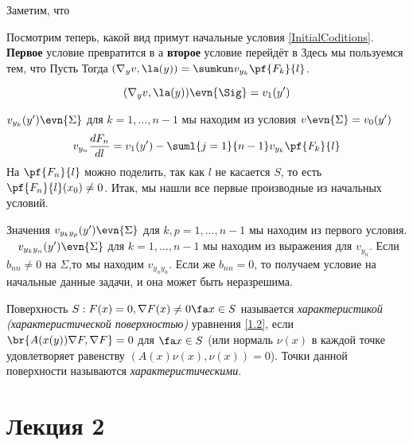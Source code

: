 \documentclass[a4paper,draft]{article}
\begin{document}
Заметим, что

Посмотрим теперь, какой вид примут начальные условия \eqref{InitialCoditions}.
\textbf{Первое} условие превратится в
а \textbf{второе} условие перейдёт в
Здесь мы пользуемся тем, что
Пусть
Тогда $({\nabla}_y v,\la (y))=\sumkun  v_{y_k}\pf{F_k}{l}$.

$$({\nabla}_y v,\la (y))\evn{\Sig}=v_1(y')$$

$v_{y_k}(y')\evn{\Sigma}$ для $k=1,\ldots,n-1$ мы находим из условия $v\evn{\Sigma}=v_0(y')$
$$v_{y_n}\frac{dF_n}{dl}=v_1(y')-\suml{j=1}{n-1}v_{y_k}\pf{F_k}{l}$$
На $\pf{F_n}{l}$ можно поделить, так как $l$ не касается $S$, то есть $\pf{F_n}{l}(x_0) \neq 0$.
Итак, мы нашли все первые производные из начальных условий.

Значения $v_{y_k y_p}(y')\evn{\Sigma}$ для $k,p=1,\ldots,n-1$ мы находим из первого
условия. $\quad v_{y_k y_n}(y')\evn{\Sigma}$ для $k=1,\ldots,n-1$ мы
находим из выражения для $v_{y_n}$.
Если $b_{nn} \neq 0$ на $\Sigma$,то мы находим $v_{y_n y_n}$. Если же $b_{nn}=0$, то получаем
условие на начальные данные задачи, и она может быть неразрешима.

\begin{df}
Поверхность $S: F(x)=0, \nabla F(x) \neq 0 \fa x \in S$ называется \emph{характеристикой}
\emph{(характеристической поверхностью)} уравнения \eqref{1.2}, если $\br{A(x(y))\nabla F,\nabla F} = 0$ для
$\fa x \in S$ (или нормаль $\nu (x)$ в каждой точке удовлетворяет равенству $(A(x)\nu (x),\nu (x))=0$).
Точки данной поверхности называются \emph{характеристическими}.
\end{df}

\section{Лекция 2}
\end{document}
